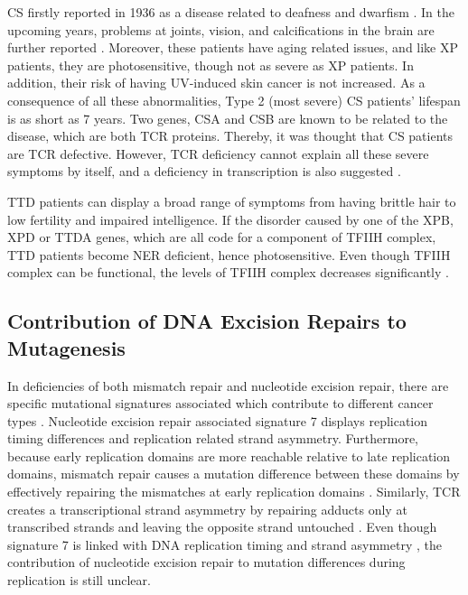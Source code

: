 CS firstly reported in 1936 as a disease related to deafness and dwarfism \citep{cockayne1936dwarfism}. In the upcoming years, problems at joints, vision, and calcifications in the brain are further reported \citep{cockayne1946dwarfism,neill1950syndrome}. Moreover, these patients have aging related issues, and like XP patients, they are photosensitive, though not as severe as XP patients. In addition, their risk of having UV-induced skin cancer is not increased. As a consequence of all these abnormalities, Type 2 (most severe) CS patients’ lifespan is as short as 7 years. Two genes, CSA and CSB are known to be related to the disease, which are both TCR proteins. Thereby, it was thought that CS patients are TCR defective. However, TCR deficiency cannot explain all these severe symptoms by itself, and a deficiency in transcription is also suggested \citep{drapkin1994dual}.

TTD patients can display a broad range of symptoms from having brittle hair to low fertility and impaired intelligence. If the disorder caused by one of the XPB, XPD or TTDA genes, which are all code for a component of TFIIH complex, TTD patients become NER deficient, hence photosensitive. Even though TFIIH complex can be functional, the levels of TFIIH complex decreases significantly \citep{giglia2006dynamic}.

\subsection{Contribution of DNA Excision Repairs to Mutagenesis}

In deficiencies of both mismatch repair and nucleotide excision repair, there are specific mutational signatures associated which contribute to different cancer types \citep{helleday2014mechanisms}. Nucleotide excision repair associated signature 7 displays replication timing differences and replication related strand asymmetry. Furthermore, because early replication domains are more reachable relative to late replication domains, mismatch repair causes a mutation difference between these domains by effectively repairing the mismatches at early replication domains \citep{supek2015differential}. Similarly, TCR creates a transcriptional strand asymmetry by repairing adducts only at transcribed strands and leaving the opposite strand untouched \citep{zheng2014transcription}. Even though signature 7 is linked with DNA replication timing and strand asymmetry \citep{tomkova2018mutational}, the contribution of nucleotide excision repair to mutation differences during replication is still unclear.


